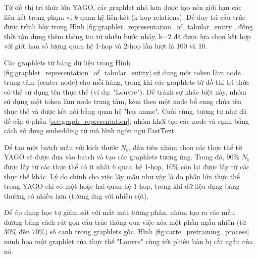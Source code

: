 \documentclass{article}
\begin{document}
Từ đồ thị tri thức lớn YAGO, các graphlet nhỏ hơn được tạo nên giới hạn các liên kết trong phạm vi $k$ quan hệ liên kết (k-hop relations). Để duy trì cấu trúc được trình bày trong Hình \ref{fig:graphlet_representation_of_tabular_entity}, đồng thời tận dụng thêm thông tin từ nhiều bước nhảy, k=2 đã được lựa chọn kết hợp với giới hạn số lượng quan hệ 1-hop và 2-hop lần lượt là 100 và 10.

Các graphlets từ bảng dữ liệu trong Hình \ref{fig:graphlet_representation_of_tabular_entity} sử dụng một token làm node trung tâm (center node) cho mỗi hàng, trong khi các graphlets từ đồ thị tri thức có thể sử dụng tên thực thể (ví dụ: "Louvre"). Để tránh sự khác biệt này, nhóm sử dụng một token làm node trung tâm, kèm theo một node bổ sung chứa tên thực thể và được kết nối bằng quan hệ "has name". Cuối cùng, tương tự như đã đề cập ở phần \ref{sec:graph_representation}, nhóm khởi tạo các node và cạnh bằng cách sử dụng embedding từ mô hình ngôn ngữ FastText.

Để tạo một batch mẫu với kích thước $N_b$, đầu tiên nhóm chọn các thực thể từ YAGO sẽ được đưa vào batch và tạo các graphlets tương ứng. Trong đó, 90\% $N_b$ được lấy từ các thực thể có ít nhất 6 quan hệ 1-hop, 10\% còn lại được lấy từ các thực thể khác. Lý do chính cho việc lấy mẫu như vậy là do phần lớn thực thể trong YAGO chỉ có một hoặc hai quan hệ 1-hop, trong khi dữ liệu dạng bảng thường có nhiều hơn (tương ứng với nhiều cột).

Để áp dụng học tự giám sát với mất mát tương phản, nhóm tạo ra các mẫu dương bằng cách rút gọn cấu trúc thông qua việc xóa một phần ngẫu nhiên (từ 30\% đến 70\%) số cạnh trong graphlets gốc. Hình \ref{fig:carte_pretraining_process} minh họa một graphlet của thực thể "Louvre" cùng với phiên bản bị cắt ngắn của nó.
\end{document}
